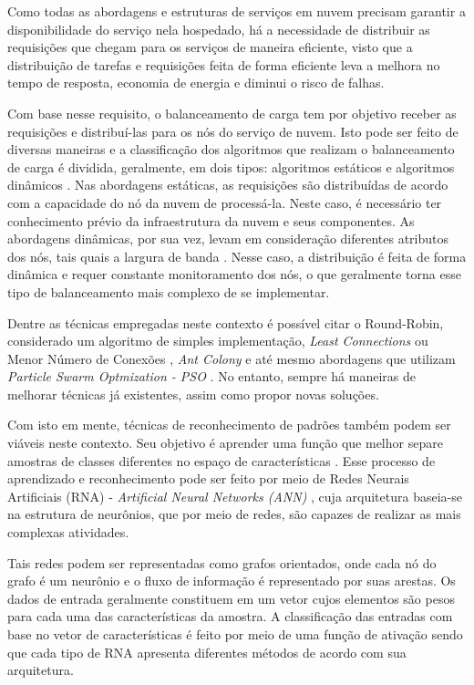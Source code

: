 Como todas as abordagens e estruturas de serviços em nuvem precisam garantir a disponibilidade do serviço nela hospedado, há a necessidade de distribuir as requisições que chegam para os serviços de maneira eficiente, visto que a distribuição de tarefas e requisições feita de forma eficiente leva a melhora no tempo de resposta, economia de energia e diminui o risco de falhas. 

Com base nesse requisito, o balanceamento de carga tem por objetivo receber as requisições e distribuí-las para os nós do serviço de nuvem. Isto pode ser feito de diversas maneiras e a classificação dos algoritmos que realizam o balanceamento de carga é dividida, geralmente, em dois tipos: algoritmos estáticos e algoritmos dinâmicos \cite{surveycloud:2012}. Nas abordagens estáticas, as requisições são distribuídas de acordo com a capacidade do nó da nuvem de processá-la. Neste caso, é necessário ter conhecimento prévio da infraestrutura da nuvem e seus componentes. As abordagens dinâmicas, por sua vez, levam em consideração diferentes atributos dos nós, tais quais a largura de banda \cite{surveycloud:2012}. Nesse caso, a distribuição é feita de forma dinâmica e requer constante monitoramento dos nós, o que geralmente torna esse tipo de balanceamento mais complexo de se implementar. 

Dentre as técnicas empregadas neste contexto é possível citar o Round-Robin, considerado um algoritmo de simples implementação, \textit{Least Connections} ou Menor Número de Conexões \cite{nginx}, \textit{Ant Colony} e até mesmo abordagens que utilizam \textit{Particle Swarm Optmization - PSO} \cite{pandey2010particle}. No entanto, sempre há maneiras de melhorar técnicas já existentes, assim como propor novas soluções.  

Com isto em mente, técnicas de reconhecimento de padrões também podem ser viáveis neste contexto. Seu objetivo é aprender uma função que melhor separe amostras de classes diferentes no espaço de características \cite{Duda:00}. Esse processo de aprendizado e reconhecimento pode ser feito por meio de Redes Neurais Artificiais (RNA) - \textit{Artificial Neural Networks (ANN)}  \cite{Haykin:07}, cuja arquitetura baseia-se na estrutura de neurônios, que por meio de redes, são capazes de realizar as mais complexas atividades. 

Tais redes podem ser representadas como grafos orientados, onde cada nó do grafo é um neurônio e o fluxo de informação é representado por suas arestas.%
Os dados de entrada geralmente constituem em um vetor cujos elementos são pesos para cada uma das características da amostra.  A classificação das entradas com base no vetor de características é feito por meio de uma função de ativação sendo que cada tipo de RNA apresenta diferentes métodos de acordo com sua arquitetura. 

